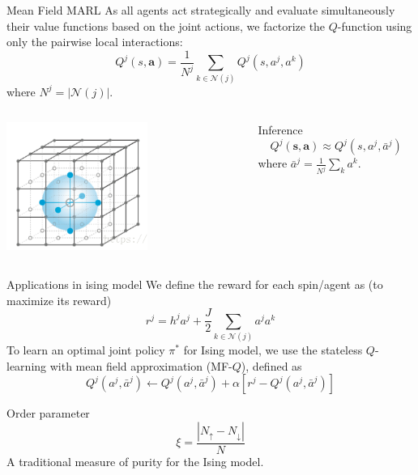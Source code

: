 \begin{frame}{Mean Field MARL}
	As all agents act strategically and evaluate simultaneously their value functions based on the
	joint actions, we factorize the $Q$-function using only the pairwise local interactions:
	$$Q^{j}(s, \boldsymbol{a})=\frac{1}{N^{j}} \sum_{k \in \mathcal{N}(j)} Q^{j}\left(s, a^{j}, a^{k}\right)$$
	where $N^{j}=|\mathcal{N}(j)|$.
	
	\begin{columns}
		\begin{column}{0.4\textwidth}
			\centerline{\includegraphics[width = 0.6\textwidth]{Figures/pa.png}}
		\end{column}
		
		\begin{column}{0.6\textwidth}
			\begin{alertblock}{Inference}
				$$Q^{j}\left(\mathbf{s}, \mathbf{a} \right) \approx Q^{j}\left(s, a^{j}, \bar{a}^{j}\right)$$
				where $\bar{a}^{j}=\frac{1}{N^{j}} \sum_{k} a^{k}$.
			\end{alertblock}
		\end{column}
	\end{columns}
\end{frame}

\begin{frame}{Applications in ising model}
	We define the reward for each spin/agent as (to maximize its reward)
	$$r^{j}=h^{j} a^{j}+\frac{J}{2} \sum_{k \in \mathcal{N}(j)} a^{j} a^{k}$$
	To learn an optimal joint policy $\pi^{*}$ for Ising model, we use the stateless $Q$-learning with mean field approximation (MF-$Q$), defined as
	$$Q^{j}\left(a^{j}, \bar{a}^{j}\right) \leftarrow Q^{j}\left(a^{j}, \bar{a}^{j}\right)+\alpha\left[r^{j}-Q^{j}\left(a^{j}, \bar{a}^{j}\right)\right]$$
	\begin{block}{Order parameter}
		$$\xi=\frac{\left|N_{\uparrow}-N_{\downarrow}\right|}{N}$$
		A traditional measure of purity for the Ising model.
	\end{block}
\end{frame}

